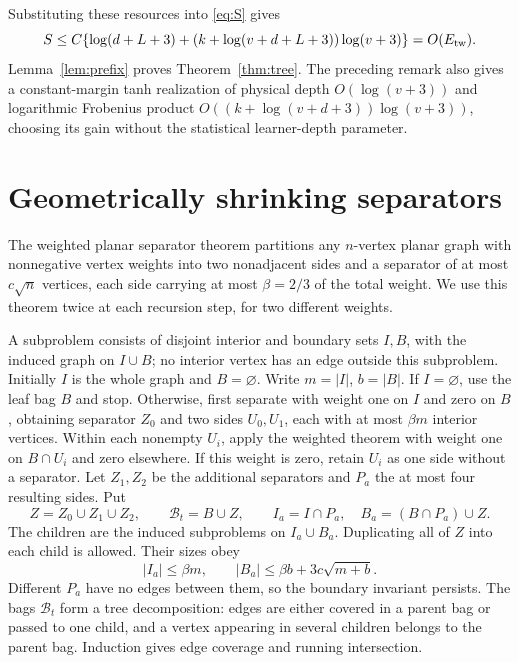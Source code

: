 \documentclass[11pt]{article}
\theoremstyle{remark}\newtheorem{remark}[theorem]{Remark}
\begin{document}
Substituting these resources into \eqref{eq:S} gives
\[
 S\le C\{\log(d+L+3)
          +(k+\log(v+d+L+3))\log(v+3)\}
       =O(E_{\rm tw}).
\]
Lemma~\ref{lem:prefix} proves Theorem~\ref{thm:tree}.
The preceding remark also gives a constant-margin tanh realization
of physical depth $O(\log(v+3))$ and logarithmic Frobenius product
$O((k+\log(v+d+3))\log(v+3))$, choosing its gain without the
statistical learner-depth parameter.

\section{Geometrically shrinking separators}
The weighted planar separator theorem \cite{lt} partitions any
$n$-vertex planar graph with nonnegative vertex weights into two
nonadjacent sides and a separator of at most $c\sqrt n$ vertices,
each side carrying at most $\beta=2/3$ of the total weight. We use
this theorem twice at each recursion step, for two different weights.

A subproblem consists of disjoint interior and boundary sets $I,B$,
with the induced graph on $I\cup B$; no interior vertex has an edge
outside this subproblem. Initially $I$ is the whole graph and
$B=\varnothing$. Write $m=|I|$, $b=|B|$. If $I=\varnothing$,
use the leaf bag $B$ and stop. Otherwise, first separate with weight
one on $I$ and zero on $B$, obtaining separator $Z_0$ and two
sides $U_0,U_1$, each with at most $\beta m$ interior vertices.
Within each nonempty $U_i$, apply the weighted theorem with weight
one on $B\cap U_i$ and zero elsewhere. If this weight is zero,
retain $U_i$ as one side without a separator. Let $Z_1,Z_2$ be
the additional separators and $P_a$ the at most four resulting
sides. Put
\[
 Z=Z_0\cup Z_1\cup Z_2,\qquad
 \mathcal B_t=B\cup Z,\qquad
 I_a=I\cap P_a,\quad B_a=(B\cap P_a)\cup Z.
\]
The children are the induced subproblems on $I_a\cup B_a$.
Duplicating all of $Z$ into each child is allowed. Their sizes obey
\begin{equation}\label{eq:boundary}
 |I_a|\le\beta m,\qquad
 |B_a|\le\beta b+3c\sqrt{m+b}.
\end{equation}
Different $P_a$ have no edges between them, so the boundary invariant
persists. The bags $\mathcal B_t$ form a tree decomposition:
edges are either covered in a parent bag or passed to one child,
and a vertex appearing in several children belongs to the parent
bag. Induction gives edge coverage and running intersection.
\end{document}
